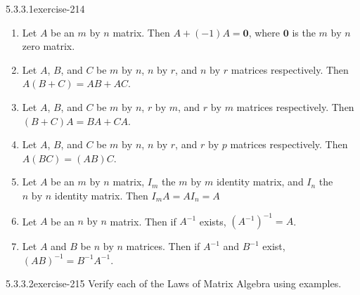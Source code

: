 \documentclass[twoside,10pt,]{book}
\numberwithin{equation}{section}
\begin{document}
\begin{divisionsolution}{5.3.3.1}{}{exercise-214}
\begin{enumerate}[label=(\alph*)]
\item\hypertarget{li-985}{}\hypertarget{p-1858}{}%
Let \(A\) be an \(m \textrm{ by } n\) matrix. Then \(A+(- 1)A=\pmb{0}\), where \(\pmb{0}\) is the \(m \textrm{ by } n\) zero matrix.%
\item\hypertarget{li-986}{}\hypertarget{p-1859}{}%
Let \(A\), \(B\), and \(C\) be \(m \textrm{ by } n\), \(n \textrm{ by } r\), and \(n \textrm{ by } r\) matrices respectively. Then \(A(B+C)=AB+AC\).%
\item\hypertarget{li-987}{}\hypertarget{p-1860}{}%
Let \(A\), \(B\), and \(C\) be \(m \textrm{ by } n\), \(r \textrm{ by } m\), and \(r \textrm{ by } m\) matrices respectively. Then \((B+C)A=BA+CA\).%
\item\hypertarget{li-988}{}\hypertarget{p-1861}{}%
Let \(A\), \(B\), and \(C\) be \(m \textrm{ by } n\), \(n \textrm{ by } r\), and \(r \textrm{ by } p\) matrices respectively. Then \(A(BC)=(AB)C\).%
\item\hypertarget{li-989}{}\hypertarget{p-1862}{}%
Let \(A\) be an \(m \textrm{ by } n\) matrix, \(I_m\) the \(m \textrm{ by } m\) identity matrix, and \(I_n\) the \(n \textrm{ by } n\) identity matrix. Then \(I_mA=AI_n=A\)%
\item\hypertarget{li-990}{}\hypertarget{p-1863}{}%
Let \(A\) be an \(n \textrm{ by } n\) matrix. Then if \(A^{-1}\) exists, \(\left(A^{-1}\right)^{-1}=A\).%
\item\hypertarget{li-991}{}\hypertarget{p-1864}{}%
Let \(A\) and \(B\) be \(n \textrm{ by } n\) matrices. Then if \(A^{-1}\) and \(B^{-1}\) exist, \((AB)^{-1}=B^{-1}A^{-1}\).%
\end{enumerate}
%
\end{divisionsolution}%
\begin{divisionsolution}{5.3.3.2}{}{exercise-215}%
\hypertarget{p-1865}{}%
Verify each of the Laws of Matrix Algebra using examples.%
\end{divisionsolution}%
\end{document}
